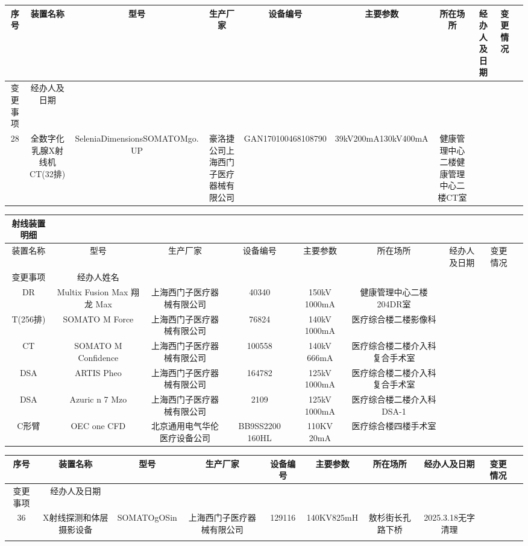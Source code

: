 \begin{table}[H]
\centering
\begin{tabular}{|c|c|c|c|c|c|c|c|c|c|}
\hline
序号 & 装置名称 & 型号 & 生产厂家 & 设备编号 & 主要参数 & 所在场所 & 经办人及日期 & 变更情况 &  \\
\hline
变更事项 & 经办人及日期 &  &  &  &  &  &  &  &  \\
\hline
28 & 全数字化乳腺X射线机CT(32排) & SeleniaDimensionsSOMATOMgo. UP & 豪洛捷公司上海西门子医疗器械有限公司 & GAN170100468108790 & 39kV200mA130kV400mA & 健康管理中心二楼健康管理中心二楼CT室 &  &  &  \\
\hline
\end{tabular}
\end{table}


\begin{table}[H]
\centering
\begin{tabular}{|c|c|c|c|c|c|c|c|c|}
\hline
射线装置明细 &  &  &  &  &  &  &  &  \\
\hline
装置名称 & 型号 & 生产厂家 & 设备编号 & 主要参数 & 所在场所 & 经办人及日期 & 变更情况 &  \\
\hline
变更事项 & 经办人姓名 &  &  &  &  &  &  &  \\
\hline
DR & Multix Fusion Max 翔 龙 Max & 上海西门子医疗器械有限公司 & 40340 & 150kV 1000mA & 健康管理中心二楼204DR室 &  &  &  \\
\hline
T(256排) & SOMATO M Force & 上海西门子医疗器械有限公司 & 76824 & 140kV 1000mA & 医疗综合楼二楼影像科 &  &  &  \\
\hline
CT & SOMATO M Confidence & 上海西门子医疗器械有限公司 & 100558 & 140kV 666mA & 医疗综合楼二楼介入科复合手术室 &  &  &  \\
\hline
DSA & ARTIS Pheo & 上海西门子医疗器械有限公司 & 164782 & 125kV 1000mA & 医疗综合楼二楼介入科复合手术室 &  &  &  \\
\hline
DSA & Azuric n 7 Mzo & 上海西门子医疗器械有限公司 & 2109 & 125kV 1000mA & 医疗综合楼二楼介入科 DSA-1 &  &  &  \\
\hline
C形臂 & OEC one CFD & 北京通用电气华伦医疗设备公司 & BB9SS2200 160HL & 110KV 20mA & 医疗综合楼四楼手术室 &  &  &  \\
\hline
\end{tabular}
\end{table}


\begin{table}[H]
\centering
\begin{tabular}{|c|c|c|c|c|c|c|c|c|c|}
\hline
序号 & 装置名称 & 型号 & 生产厂家 & 设备编号 & 主要参数 & 所在场所 & 经办人及日期 & 变更情况 &  \\
\hline
变更事项 & 经办人及日期 &  &  &  &  &  &  &  &  \\
\hline
36 & X射线探测和体层摄影设备 & SOMATOgOSin & 上海西门子医疗器械有限公司 & 129116 & 140KV825mH & 敖杉街长孔路下桥 & 2025.3.18无字清理 &  &  \\
\hline
 &  &  &  &  &  &  &  &  &  \\
\hline
\end{tabular}
\end{table}


